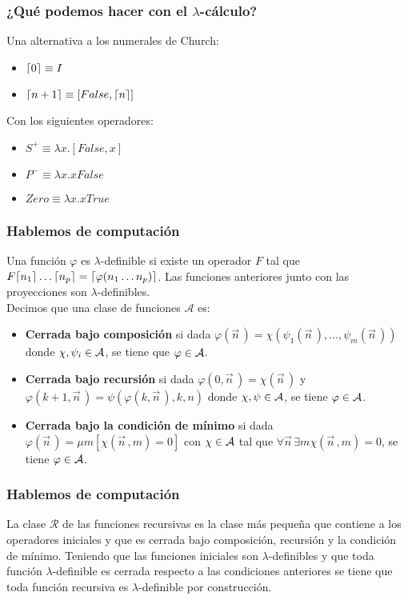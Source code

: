 \documentclass[spanish, a4paper, 12pt, final, slideColor, nototal, colorBG, pdf, noaccumulate, darkblue] {beamer}
\DeclarePairedDelimiter{\ceil}{\lceil}{\rceil}
\begin{document}
\begin{frame}
    \frametitle{¿Qué podemos hacer con el $\lambda$-cálculo?}
    Una alternativa a los numerales de Church:
    \begin{itemize}
        \item $\ceil{0} \equiv I$
        \item $\ceil{n+1} \equiv [False, \ceil{n}]$
    \end{itemize}
    Con los siguientes operadores:
    \begin{itemize}
        \item $S^{+} \equiv \lambda x.[False, x]$
        \item $P^{-} \equiv \lambda x.xFalse$
        \item $Zero \equiv \lambda x.xTrue$
    \end{itemize}
\end{frame}
\begin{frame}
    \frametitle{Hablemos de computación}
    Una función $\varphi$ es $\lambda$-definible si existe un operador $F$ tal que $F\ceil{n_1}\ldots\ceil{n_p} = \ceil{\varphi(n_1\ldots n_p)}$. Las funciones anteriores junto con las proyecciones son $\lambda$-definibles.\\
    Decimos que una clase de funciones $\mathcal{A}$ es:
    \begin{itemize}
        \item \textbf{Cerrada bajo composición} si dada $\varphi(\vec{n}^{\,}) = \chi(\psi_1(\vec{n}^{\,}),\ldots, \psi_m(\vec{n}^{\,}))$ donde $\chi, \psi_i \in \cal{A}$, se tiene que $\varphi \in \cal{A}$.
        \item \textbf{Cerrada bajo recursión} si dada $\varphi(0, \vec{n}^{\,}) = \chi(\vec{n}^{\,})$ y $\varphi(k+1, \vec{n}^{\,}) = \psi(\varphi(k, \vec{n}^{\,}), k, n)$ donde $\chi, \psi \in \cal{A}$, se tiene $\varphi \in \cal{A}$.
        \item \textbf{Cerrada bajo la condición de mínimo} si dada $\varphi(\vec{n}^{\,}) = \mu m[\chi(\vec{n}^{\,}, m) = 0]$ con $\chi \in \cal{A}$ tal que $\forall \vec{n}^{\,} \exists m \chi(\vec{n}^{\,}, m) = 0$, se tiene $\varphi \in \cal{A}$.
    \end{itemize}
\end{frame}
\begin{frame}
    \frametitle{Hablemos de computación}
    La clase $\mathcal{R}$ de las funciones recursivas es la clase más pequeña que contiene a los operadores iniciales y que es cerrada bajo composición, recursión y la condición de mínimo. Teniendo que las funciones iniciales son $\lambda$-definibles y que toda función $\lambda$-definible es cerrada respecto a las condiciones anteriores se tiene que toda función recursiva es $\lambda$-definible por construcción.
\end{frame}
\end{document}
